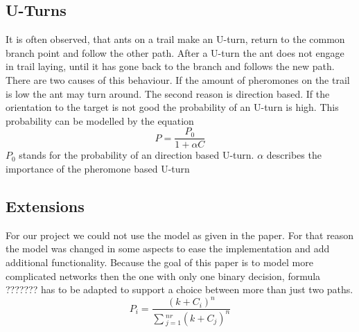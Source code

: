 \subsection{U-Turns}
It is often observed, that ants on a trail make an U-turn, return to the common branch point and follow the other path. After a U-turn the ant does not engage in trail laying, until it has gone back to the branch and follows the new path. There are two causes of this behaviour. If the amount of pheromones on the trail is low the ant may turn around. The second reason is direction based. If the orientation to the target is not good the probability of an U-turn is high. This probability can be modelled by the equation
$$P=\frac{P_0}{1+\alpha C}$$
$P_0$ stands for the probability of an direction based U-turn. $\alpha$ describes the importance of the pheromone based U-turn
\subsection{Extensions}
For our project we could not use the model as given in the paper. For that reason the model was changed in some aspects to ease the implementation and add additional functionality. Because the goal of this paper is to model more complicated networks then the one with only one binary decision, formula ??????? has to be adapted to support a choice between more than just two paths. 
$$P_i = \frac{(k+C_i)^n}{\sum{_{j=1}^{nr}(k+C_j)^n}}$$